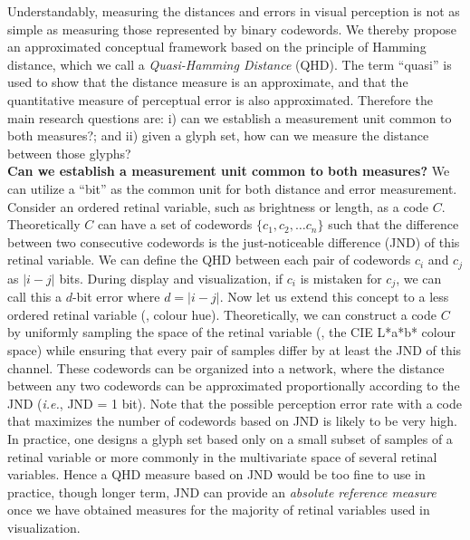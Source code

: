 Understandably, measuring the distances and errors in visual perception is not as simple as measuring those represented by binary codewords.
We thereby propose an approximated conceptual framework based on the principle of Hamming distance, which we call a \emph{Quasi-Hamming Distance} (QHD).
The term ``quasi'' is used to show that the distance measure is an approximate, and that the quantitative measure of perceptual error is also approximated.
Therefore the main research questions are:
i) can we establish a measurement unit common to both measures?; and
ii) given a glyph set, how can we measure the distance between those glyphs?\\

\noindent\textbf{Can we establish a measurement unit common to both measures?} We can utilize a ``bit'' as the common unit for both distance and error measurement.
Consider an ordered retinal variable, such as brightness or length, as a code $C$.
Theoretically $C$ can have a set of codewords $\{ c_1, c_2, \ldots c_n \}$ such that the difference between two consecutive codewords is the just-noticeable difference (JND) of this retinal variable.
We can define the QHD between each pair of codewords $c_i$ and $c_j$ as $|i-j|$ bits.
During display and visualization, if $c_i$ is mistaken for $c_j$, we can call this a $d$-bit error where $d=|i-j|$.
Now let us extend this concept to a less ordered retinal variable (\eg, colour hue).
Theoretically, we can construct a code $C$ by uniformly sampling the space of the retinal variable (\eg, the CIE L*a*b* colour space) while ensuring that every pair of samples differ by at least the JND of this channel.
These codewords can be organized into a network, where the distance between any two codewords can be approximated proportionally according to the JND (\emph{i.e.}, JND = 1 bit).
Note that the possible perception error rate with a code that maximizes the number of codewords based on JND is likely to be very high.
In practice, one designs a glyph set based only on a small subset of samples of a retinal variable or more commonly in the multivariate space of several retinal variables.
Hence a QHD measure based on JND would be too fine to use in practice, though longer term, JND can provide an \emph{absolute reference measure} once we have obtained measures for the majority of retinal variables used in visualization.\\

